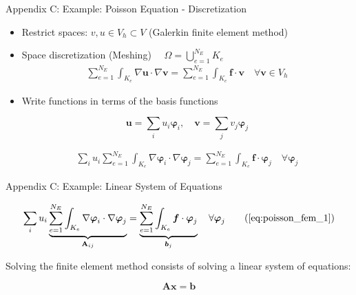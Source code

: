 \documentclass[handout,xcolor=pdftex,table,10pt,yellow,mathserif]{beamer}
\begin{document}
\begin{frame}[noframenumbering]{Appendix C: Example: Poisson Equation - Discretization}

    \begin{itemize}
        \item Restrict spaces: $v, u \in V_h \subset V$ (Galerkin finite element method)
        
        \pause

        \item Space discretization (Meshing)
            $\displaystyle \quad \Omega = \bigcup^{N_E}_{e = 1} K_e$
            \begin{align*}
                \sum_{e=1}^{N_E} \int_{K_e} \nabla \boldsymbol{u} \cdot \nabla \boldsymbol{v} = \sum_{e=1}^{N_E} \int_{K_e} \boldsymbol{f} \cdot \boldsymbol{v} \quad \forall \boldsymbol{v} \in V_h
            \end{align*}

        \pause

        \item Write functions in terms of the basis functions
        
            \[
                \boldsymbol{u} = \sum_i u_i \boldsymbol{\varphi}_i, \quad \boldsymbol{v} = \sum_j v_j \boldsymbol{\varphi}_j    
            \]

            \begin{align}
                \sum_i u_i \sum_{e=1}^{N_E} \int_{K_e} \nabla \boldsymbol{\varphi}_i \cdot \nabla \boldsymbol{\varphi}_j = \sum^{N_E}_{e=1} \int_{K_e} \boldsymbol{f} \cdot \boldsymbol{\varphi}_j \quad \forall \boldsymbol{\varphi}_j \label{eq:poisson_fem_1}
            \end{align}
    \end{itemize}

\end{frame}

\begin{frame}[noframenumbering]{Appendix C: Example: Linear System of Equations}

    \begin{align}
        \sum_i u_i \underbrace{\sum_{e=1}^{N_E} \int_{K_e} \nabla \boldsymbol{\varphi}_i \cdot \nabla \boldsymbol{\varphi}_j}_{\mathbf{A}_{ij}} = \underbrace{\sum^{N_E}_{e=1} \int_{K_e} \boldsymbol{f} \cdot \boldsymbol{\varphi}_j}_{\boldsymbol{b}_j} \quad \forall \boldsymbol{\varphi}_j \tag{\ref{eq:poisson_fem_1}}
    \end{align}

    \pause

    Solving the finite element method consists of solving a linear system of equations:

    \[\mathbf{A}\boldsymbol{x} = \boldsymbol{b}\]

\end{frame}
\end{document}

